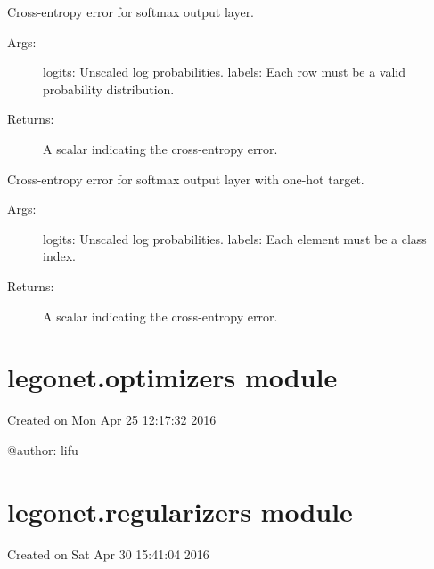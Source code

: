 \documentclass[letterpaper,10pt,english]{sphinxmanual}
\begin{document}

\begin{fulllineitems}
\label{legonet:legonet.objectives.softmax_cross_entropy}
Cross-entropy error for softmax output layer.
\begin{description}
\item[{Args:}] \leavevmode
logits: Unscaled log probabilities.
labels: Each row must be a valid probability distribution.

\item[{Returns:}] \leavevmode
A scalar indicating the cross-entropy error.

\end{description}

\end{fulllineitems}


\begin{fulllineitems}
\label{legonet:legonet.objectives.sparse_softmax_cross_entropy}
Cross-entropy error for softmax output layer with one-hot target.
\begin{description}
\item[{Args:}] \leavevmode
logits: Unscaled log probabilities.
labels: Each element must be a class index.

\item[{Returns:}] \leavevmode
A scalar indicating the cross-entropy error.

\end{description}

\end{fulllineitems}



\section{legonet.optimizers module}
\label{legonet:module-legonet.optimizers}\label{legonet:legonet-optimizers-module}
Created on Mon Apr 25 12:17:32 2016

@author: lifu


\section{legonet.regularizers module}
\label{legonet:module-legonet.regularizers}\label{legonet:legonet-regularizers-module}
Created on Sat Apr 30 15:41:04 2016
\end{document}
